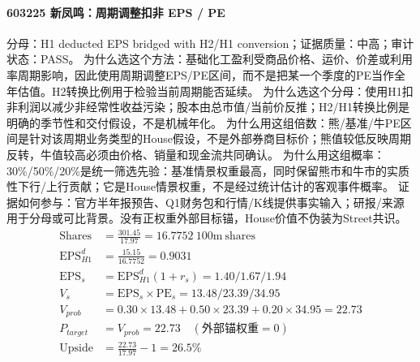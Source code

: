 \paragraph{603225 新凤鸣：周期调整扣非 EPS / PE}
分母：H1 deducted EPS bridged with H2/H1 conversion；证据质量：中高；审计状态：PASS。
为什么选这个方法：基础化工盈利受商品价格、运价、价差或利用率周期影响，因此使用周期调整EPS/PE区间，而不是把某一个季度的PE当作全年估值。H2转换比例用于检验当前周期能否延续。
为什么选这个分母：使用H1扣非利润以减少非经常性收益污染；股本由总市值/当前价反推；H2/H1转换比例是明确的季节性和交付假设，不是机械年化。
为什么用这组倍数：熊/基准/牛PE区间是针对该周期业务类型的House假设，不是外部券商目标价；熊值较低反映周期反转，牛值较高必须由价格、销量和现金流共同确认。
为什么用这组概率：30\%/50\%/20\%是统一筛选先验：基准情景权重最高，同时保留熊市和牛市的实质性下行/上行贡献；它是House情景权重，不是经过统计估计的客观事件概率。
证据如何参与：官方半年报预告、Q1财务包和行情/K线提供事实输入；研报/来源用于分母或可比背景。没有正权重外部目标锚，House价值不伪装为Street共识。
\begin{align*}
\mathrm{Shares} &= \frac{301.45}{17.97}=16.7752\ \mathrm{100m\ shares}\\
\mathrm{EPS}_{H1}^d &= \frac{15.15}{16.7752}=0.9031\\
\mathrm{EPS}_s &= \mathrm{EPS}_{H1}^d(1+r_s)=1.40/1.67/1.94\\
V_s &= \mathrm{EPS}_s\times \mathrm{PE}_s=13.48/23.39/34.95\\
V_{prob} &= 0.30\times 13.48+0.50\times 23.39+0.20\times 34.95=22.73\\
P_{target} &= V_{prob}=22.73\quad(\text{外部锚权重}=0)\\
\mathrm{Upside} &= \frac{22.73}{17.97}-1=26.5\%\\
\end{align*}


